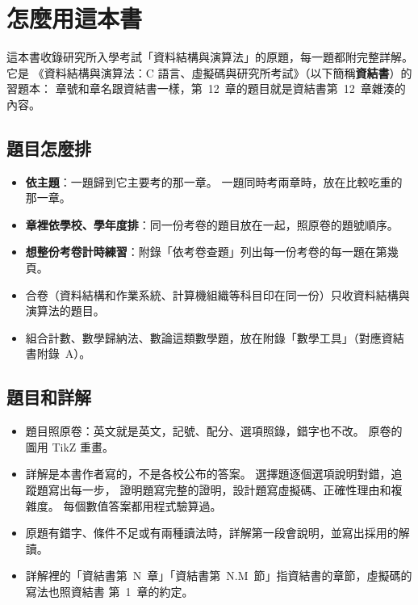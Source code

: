 \chapter*{怎麼用這本書}

這本書收錄研究所入學考試「資料結構與演算法」的原題，每一題都附完整詳解。 它是
《資料結構與演算法：C 語言、虛擬碼與研究所考試》（以下簡稱\textbf{資結書}）的習題本：
章號和章名跟資結書一樣，第~12~章的題目就是資結書第~12~章雜湊的內容。

\section*{題目怎麼排}

\begin{itemize}
\item \textbf{依主題}：一題歸到它主要考的那一章。 一題同時考兩章時，放在比較吃重的那一章。
\item \textbf{章裡依學校、學年度排}：同一份考卷的題目放在一起，照原卷的題號順序。
\item \textbf{想整份考卷計時練習}：附錄「依考卷查題」列出每一份考卷的每一題在第幾頁。
\item 合卷（資料結構和作業系統、計算機組織等科目印在同一份）只收資料結構與演算法的題目。
\item 組合計數、數學歸納法、數論這類數學題，放在附錄「數學工具」（對應資結書附錄~A）。
\end{itemize}

\section*{題目和詳解}

\begin{itemize}
\item 題目照原卷：英文就是英文，記號、配分、選項照錄，錯字也不改。 原卷的圖用 TikZ 重畫。
\item 詳解是本書作者寫的，不是各校公布的答案。 選擇題逐個選項說明對錯，追蹤題寫出每一步，
證明題寫完整的證明，設計題寫虛擬碼、正確性理由和複雜度。 每個數值答案都用程式驗算過。
\item 原題有錯字、條件不足或有兩種讀法時，詳解第一段會說明，並寫出採用的解讀。
\item 詳解裡的「資結書第~N~章」「資結書第~N.M~節」指資結書的章節，虛擬碼的寫法也照資結書
第~1~章的約定。
\end{itemize}

